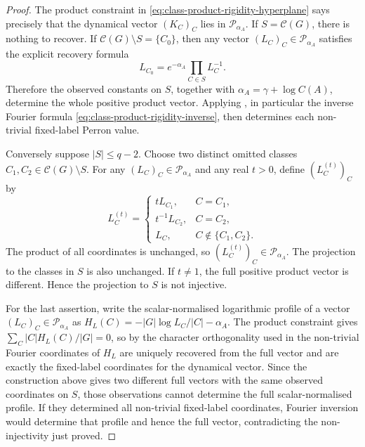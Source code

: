 \documentclass[11pt,a4paper]{amsart}
\theoremstyle{plain}
\theoremstyle{definition}
\theoremstyle{remark}
\begin{document}
\begin{proof}
  The product constraint in
  \eqref{eq:class-product-rigidity-hyperplane} says precisely that the
  dynamical vector \((K_C)_C\) lies in \(\mathcal P_{\alpha_A}\).  If
  \(S=\mathcal C(G)\), there is nothing to recover.  If
  \(\mathcal C(G)\setminus S=\{C_0\}\), then any vector
  \((L_C)_C\in\mathcal P_{\alpha_A}\) satisfies the explicit recovery formula
  \begin{equation}\label{eq:q-minus-one-missing-class-recovery}
    L_{C_0}=e^{-\alpha_A}\prod_{C\in S}L_C^{-1}.
  \end{equation}
  Therefore the observed constants on \(S\), together with \(\alpha_A
  =\gamma+\log C(A)\), determine the whole positive product vector.  Applying
  , in particular the inverse
  Fourier formula \eqref{eq:class-product-rigidity-inverse}, then determines
  each non-trivial fixed-label Perron value.

  Conversely suppose \(|S|\le q-2\).  Choose two distinct omitted classes
  \(C_1,C_2\in\mathcal C(G)\setminus S\).  For any
  \((L_C)_C\in\mathcal P_{\alpha_A}\) and any real \(t>0\), define
  \((L_C^{(t)})_C\) by
  \[
    L_C^{(t)}=
    \begin{cases}
      tL_{C_1},& C=C_1,\\
      t^{-1}L_{C_2},& C=C_2,\\
      L_C,& C\notin\{C_1,C_2\}.
    \end{cases}
  \]
  The product of all coordinates is unchanged, so
  \((L_C^{(t)})_C\in\mathcal P_{\alpha_A}\).  The projection to the classes in
  \(S\) is also unchanged.  If \(t\ne1\), the full positive product vector is
  different.  Hence the projection to \(S\) is not injective.

  For the last assertion, write the scalar-normalised logarithmic profile of
  a vector \((L_C)_C\in\mathcal P_{\alpha_A}\) as
  \(H_L(C)=-|G|\log L_C/|C|-\alpha_A\).  The product constraint gives
  \(\sum_C |C|H_L(C)/|G|=0\), so by the character orthogonality used in
   the non-trivial Fourier
  coordinates of \(H_L\) are uniquely recovered from the full vector and are
  exactly the fixed-label coordinates for the dynamical vector.  Since the
  construction above gives two different full vectors with the same observed
  coordinates on \(S\), those observations cannot determine the full
  scalar-normalised profile.  If they determined all non-trivial fixed-label
  coordinates, Fourier inversion would determine that profile and hence the
  full vector, contradicting the non-injectivity just proved.
\end{proof}
\end{document}
